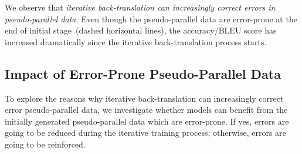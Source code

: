 \documentclass[letterpaper]{article} %
\begin{document}
We observe that \emph{iterative back-translation can increasingly correct errors in pseudo-parallel data.}
Even though the pseudo-parallel data are error-prone at the end of initial stage~(dashed horizontal lines), the accuracy/BLEU score has increased dramatically since the iterative back-translation process starts.




\subsection{Impact of Error-Prone Pseudo-Parallel Data}
\label{section:static}

To explore the reasons why iterative back-translation can increasingly correct error pseudo-parallel data, we investigate whether models can benefit from the initially generated pseudo-parallel data which are error-prone.
If yes, errors are going to be reduced during the iterative training process;
otherwise, errors are going to be reinforced.
\end{document}
